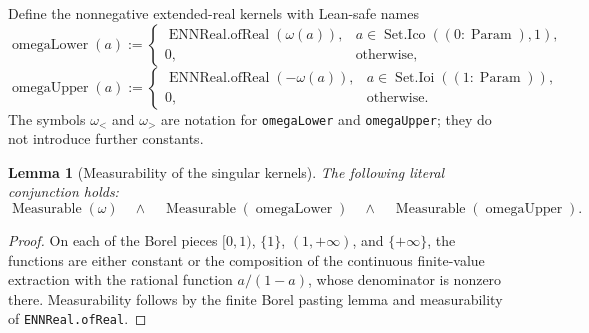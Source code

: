 \documentclass[9pt]{extarticle}
\newtheorem{lemma}{Lemma}[section]
\theoremstyle{definition}
\theoremstyle{remark}
\begin{document}
Define the nonnegative extended-real kernels with Lean-safe names
\[
 \operatorname{omegaLower}(a):=
 \begin{cases}
  \operatorname{ENNReal.ofReal}(\omega(a)),
    &a\in\operatorname{Set.Ico}((0:\operatorname{Param}),1),\\
  0,&\text{otherwise},
 \end{cases}
\]
\[
 \operatorname{omegaUpper}(a):=
 \begin{cases}
  \operatorname{ENNReal.ofReal}(-\omega(a)),
    &a\in\operatorname{Set.Ioi}((1:\operatorname{Param})),\\
  0,&\text{otherwise}.
 \end{cases}
\]
The symbols $\omega_<$ and $\omega_>$ are notation for
\texttt{omegaLower} and \texttt{omegaUpper}; they do not introduce further
constants.
\begin{lemma}[Measurability of the singular kernels]
\label{lem:fnd-omega-measurable}
The following literal conjunction holds:
\[
 \operatorname{Measurable}(\omega)
 \quad\wedge\quad
 \operatorname{Measurable}(\operatorname{omegaLower})
 \quad\wedge\quad
 \operatorname{Measurable}(\operatorname{omegaUpper}).
\]
\end{lemma}

\begin{proof}
On each of the Borel pieces $[0,1)$, $\{1\}$,
$(1,+\infty)$, and $\{+\infty\}$, the functions are either constant or the
composition of the continuous finite-value extraction with the rational
function $a/(1-a)$, whose denominator is nonzero there.  Measurability follows
by the finite Borel pasting lemma and measurability of
\texttt{ENNReal.ofReal}.
\end{proof}
\end{document}
